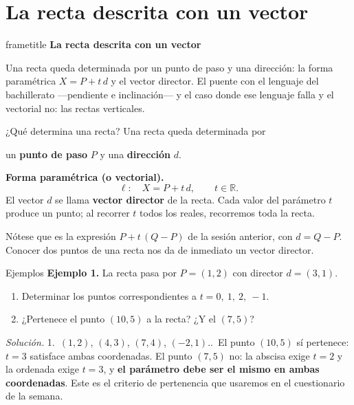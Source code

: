 \documentclass[aspectratio=169,10pt]{beamer}
\newcommand{\destaca}[1]{%
  \par\vspace{3pt}\noindent
  \colorbox{turquesaClaro}{%
    \parbox{\dimexpr\linewidth-2\fboxsep\relax}{\vspace{3pt}#1\vspace{3pt}}}%
  \par\vspace{3pt}}
\newcommand{\hojaSesion}[2]{%
  \vfill
  \begin{beamercolorbox}[wd=\textwidth,sep=16pt,center]{frametitle}
    {\Large\bfseries #1}\\[11pt]
    \begin{minipage}{0.82\textwidth}\centering\small #2\end{minipage}
  \end{beamercolorbox}
  \vfill}
\newcommand{\R}{\mathbb{R}}
\begin{document}
\section{La recta descrita con un vector}
\begin{frame}[plain]
  \hojaSesion{La recta descrita con un vector}{%
  Una recta queda determinada por un punto de paso y una dirección:
  la forma paramétrica $X=P+t\,d$ y el vector director. El puente con
  el lenguaje del bachillerato ---pendiente e inclinación--- y el caso
  donde ese lenguaje falla y el vectorial no: las rectas verticales.}
\end{frame}
\begin{frame}{¿Qué determina una recta?}
  Una recta queda determinada por
  \begin{center}
    {\large un \textbf{punto de paso} $P$ \quad y \quad
     una \textbf{dirección} $d$.}
  \end{center}

  \vspace{0.3cm}
  \destaca{\textbf{Forma paramétrica (o vectorial).}
  \[
    \ell:\quad X = P + t\,d, \qquad t\in\R .
  \]
  El vector $d$ se llama \textbf{vector director} de la recta. Cada
  valor del parámetro $t$ produce un punto; al recorrer $t$ todos los
  reales, recorremos toda la recta.}

  \vspace{0.3cm}
  Nótese que es la expresión $P+t\,(Q-P)$ de la sesión anterior, con
  $d=Q-P$. Conocer dos puntos de una recta nos da de inmediato un
  vector director.
\end{frame}
\begin{frame}{Ejemplos}
  \textbf{Ejemplo 1.} La recta pasa por $P=(1,2)$ con director
  $d=(3,1)$.
  \begin{enumerate}
    \item Determinar los puntos correspondientes a $t=0,\ 1,\ 2,\ -1$.
    \item ¿Pertenece el punto $(10,5)$ a la recta? ¿Y el $(7,5)$?
  \end{enumerate}

  \vspace{0.4cm}
  \destaca{\small \textit{Solución.} 1.~$(1,2)$, $(4,3)$, $(7,4)$,
  $(-2,1)$.\quad 2.~El punto $(10,5)$ sí pertenece: $t=3$ satisface
  ambas coordenadas. El punto $(7,5)$ no: la abscisa exige $t=2$ y la
  ordenada exige $t=3$, y \textbf{el parámetro debe ser el mismo en
  ambas coordenadas}. Este es el criterio de pertenencia que usaremos
  en el cuestionario de la semana.}
\end{frame}
\end{document}

